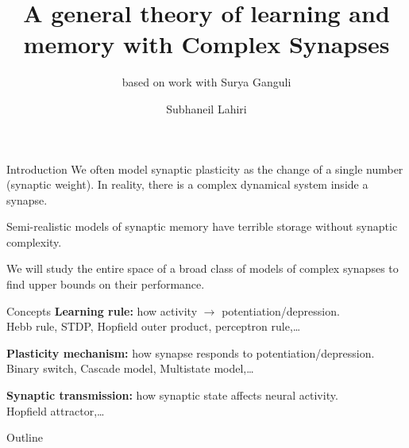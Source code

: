 \documentclass{beamer}%
\title[Complex synapses]{A general theory of learning and memory with Complex Synapses}
\subtitle{\small{based on work with Surya Ganguli}
}
\author{Subhaneil Lahiri%
}
\institute[Stanford]{%
Stanford University, Applied Physics
}
\begin{document}

\begin{frame}
%
 \titlepage
%
\end{frame}


\begin{frame}{Introduction}
%
 We often model synaptic plasticity as the change of a single number (synaptic weight).
 In reality, there is a complex dynamical system inside a synapse.

 \vp Semi-realistic models of synaptic memory have terrible storage without synaptic complexity.

 \vp We will study the entire space of a broad class of models of complex synapses to find upper bounds on their performance.

%
\end{frame}


\begin{frame}{Concepts}
%
 \textbf{Learning rule:} how activity $\to$ potentiation/depression.\\
 \hp \eg Hebb rule, STDP, Hopfield outer product, perceptron rule,\ldots
 
 \vp \textbf{Plasticity mechanism:} how synapse responds to potentiation/depression.\\
 \hp \eg Binary switch, Cascade model, Multistate model,\ldots
 
 \vp \textbf{Synaptic transmission:} how synaptic state affects neural activity.\\
 \hp \eg Hopfield attractor,\ldots
 
%
\end{frame}


\begin{frame}{Outline}
%
 \tableofcontents[hideallsubsections]
%
\end{frame}
\end{document}
